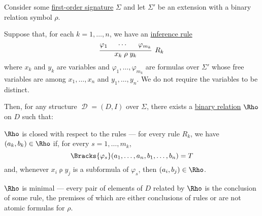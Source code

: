 \begin{theorem}\label{thm:recursively_defined_relations}
  Consider some \hyperref[def:first_order_signature]{first-order signature} \( \Sigma \) and let \( \Sigma' \) be an extension with a binary relation symbol \( \rho \).

  Suppose that, for each \( k = 1, \ldots, n \), we have an \hyperref[def:inference_rule]{inference rule}
  \begin{equation*}
    \begin{prooftree}
      \hypo{ \varphi_1 }
      \hypo{ \cdots }
      \hypo{ \varphi_{m_k} }
      \infer3[\( R_k \)]{ x_k \mathrel{\rho} y_k },
    \end{prooftree}
  \end{equation*}
  where \( x_k \) and \( y_k \) are variables and \( \varphi_1, \ldots, \varphi_{m_k} \) are formulas over \( \Sigma' \) whose free variables are among \( x_1, \ldots, x_n \) and \( y_1, \ldots, y_n \). We do not require the variables to be distinct.

  Then, for any structure \( \mscrD = (D, I) \) over \( \Sigma \), there exists a \hyperref[def:binary_relation]{binary relation} \( \Rho \) on \( D \) such that:
  \begin{thmenum}
     \( \Rho \) is closed with respect to the rules --- for every rule \( R_k \), we have \( (a_k, b_k) \in \Rho \) if, for every \( s = 1, \ldots, m_k \),
    \begin{equation*}
      \Bracks{\varphi_s}(a_1, \ldots, a_n, b_1, \ldots, b_n) = T
    \end{equation*}
    and, whenever \( x_i \mathrel{\rho} y_j \) is a subformula of \( \varphi_s \), then \( (a_i, b_j) \in \Rho \).

     \( \Rho \) is minimal --- every pair of elements of \( D \) related by \( \Rho \) is the conclusion of some rule, the premises of which are either conclusions of rules or are not atomic formulas for \( \rho \).
  \end{thmenum}
\end{theorem}
